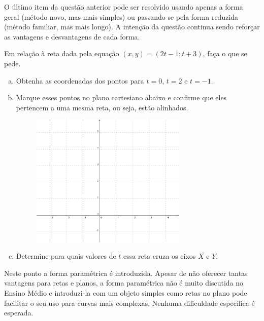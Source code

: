 \documentclass[main_estudante.tex]{subfiles}
\begin{document}
O último item da questão anterior pode ser resolvido usando apenas a forma geral (método novo, mas mais simples) ou passando-se pela forma reduzida (método familiar, mas mais longo). A intenção da questão continua sendo reforçar as vantagens e desvantagens de cada forma.

\begin{questao}
Em relação à reta dada pela equação $(x,y)=(2t-1;t+3)$, faça o que se pede.
\begin{enumerate}[a)]
\item Obtenha as coordenadas dos pontos para $t=0$, $t=2$ e $t=-1$.
\item Marque esses pontos no plano cartesiano abaixo e confirme que eles pertencem a uma mesma reta, ou seja, estão alinhados.

\begin{figure}[h]
\centering
\includegraphics[width=0.7\textwidth]{./img/c6q10.png}
\end{figure}

\item Determine para quais valores de $t$ essa reta cruza os eixos $X$ e $Y$.
\end{enumerate} 
\end{questao}

Neste ponto a forma paramétrica é introduzida. Apesar de não oferecer tantas vantagens para retas e planos, a forma paramétrica não é muito discutida no Ensino Médio e introduzi-la com um objeto simples como retas no plano pode facilitar o seu uso para curvas mais complexas. Nenhuma dificuldade específica é esperada.
\end{document}
